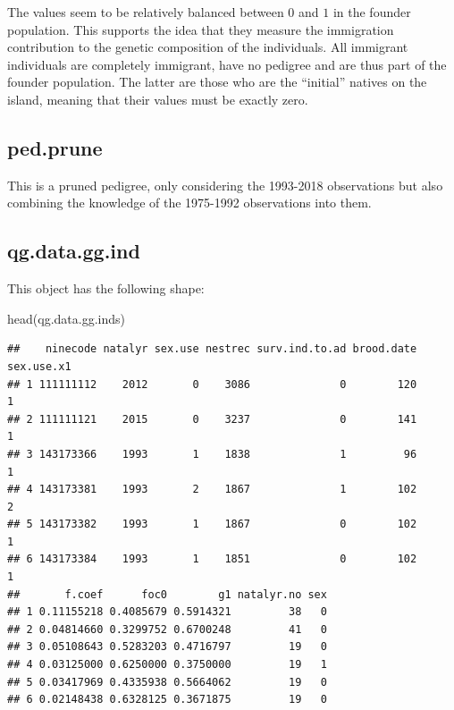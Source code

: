 \documentclass[
]{article}
\newenvironment{Shaded}{\begin{snugshade}}{\end{snugshade}}
\newcommand{\FunctionTok}[1]{\textcolor[rgb]{0.00,0.00,0.00}{#1}}
\newcommand{\NormalTok}[1]{#1}
\begin{document}
The values seem to be relatively balanced between \(0\) and \(1\) in the
founder population. This supports the idea that they measure the
immigration contribution to the genetic composition of the individuals.
All immigrant individuals are completely immigrant, have no pedigree and
are thus part of the founder population. The latter are those who are
the ``initial'' natives on the island, meaning that their values must be
exactly zero.

\hypertarget{ped.prune}{%
\subsection*{ped.prune}\label{ped.prune}}

This is a pruned pedigree, only considering the 1993-2018 observations
but also combining the knowledge of the 1975-1992 observations into
them.

\hypertarget{qg.data.gg.ind}{%
\subsection*{qg.data.gg.ind}\label{qg.data.gg.ind}}

This object has the following shape:

\begin{Shaded}
\begin{Highlighting}[]
\FunctionTok{head}\NormalTok{(qg.data.gg.inds)}
\end{Highlighting}
\end{Shaded}

\begin{verbatim}
##    ninecode natalyr sex.use nestrec surv.ind.to.ad brood.date sex.use.x1
## 1 111111112    2012       0    3086              0        120          1
## 2 111111121    2015       0    3237              0        141          1
## 3 143173366    1993       1    1838              1         96          1
## 4 143173381    1993       2    1867              1        102          2
## 5 143173382    1993       1    1867              0        102          1
## 6 143173384    1993       1    1851              0        102          1
##       f.coef      foc0        g1 natalyr.no sex
## 1 0.11155218 0.4085679 0.5914321         38   0
## 2 0.04814660 0.3299752 0.6700248         41   0
## 3 0.05108643 0.5283203 0.4716797         19   0
## 4 0.03125000 0.6250000 0.3750000         19   1
## 5 0.03417969 0.4335938 0.5664062         19   0
## 6 0.02148438 0.6328125 0.3671875         19   0
\end{verbatim}
\end{document}
